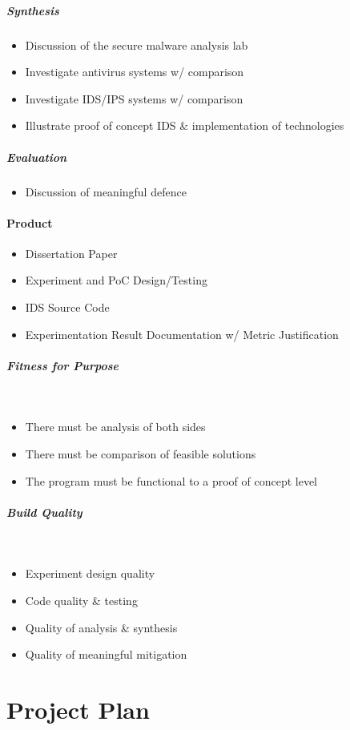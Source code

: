 \subparagraph{Synthesis}
\begin{itemize}
	\item {Discussion of the secure malware analysis lab}
	\item Investigate antivirus systems w/ comparison
	\item Investigate IDS/IPS systems w/ comparison
	\item Illustrate proof of concept IDS \& implementation of technologies
\end{itemize}

\subparagraph{Evaluation}
\begin{itemize}
	\item Discussion of meaningful defence
\end{itemize}

\paragraph{Product}
\begin{itemize}
	\item Dissertation Paper
	\item Experiment and PoC Design/Testing
	\item IDS Source Code
	\item Experimentation Result Documentation w/ Metric Justification
\end{itemize}

\subparagraph{Fitness for Purpose}~
\begin{itemize}
	\item There must be analysis of both sides
	\item There must be comparison of feasible solutions
	\item The program must be functional to a proof of concept level
\end{itemize}

\subparagraph{Build Quality}~
\begin{itemize}
	\item Experiment design quality
	\item Code quality \& testing
	\item Quality of analysis \& synthesis
	\item Quality of meaningful mitigation
\end{itemize}
\section{Project Plan}
\noindent
{}

